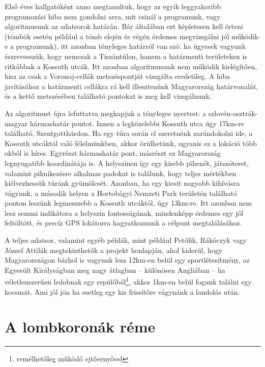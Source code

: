 \documentclass[a5paper,10pt]{article}
\begin{document}
\bigskip

Első éves hallgatóként anno megtanultuk, hogy az egyik leggyakoribb programozási hiba nem gondolni arra, mit csinál a programunk, vagy algoritmusunk az adatsorok határán. Bár általában ezt képletesen kell érteni (tömbök esetén például a tömb elején és végén érdemes megvizsgálni jól működik-e a programunk), itt azonban tényleges határról van szó: ha ügyesek vagyunk észrevesszük, hogy nemcsak a Tiszántúlon, hanem a határmenti területeken is ritkábbak a Kossuth utcák. Itt azonban algoritmusunk nem működik kielégítően, hisz az csak a Voronoj-cellák metszéspontját vizsgálta eredetileg. A hiba javításához a határmenti cellákra rá kell illesztenünk Magyarország határvonalát, és a kettő metszésében található pontokat is meg kell vizsgálnunk.

\bigskip

Az algoritmust újra lefuttatva megkapjuk a tényleges nyertest: a szlovén-osztrák-magyar hármashatár pontot. Innen a legközelebbi Kossuth utca úgy 17km-re található, Szentgotthárdon. Ha egy túra során el szeretnénk zarándokolni ide, a Kossuth utcáktól való félelmünkben, akkor örülhetünk, ugyanis ez a lokáció több okból is híres. Egyrészt hármashatár pont, másrészt ez Magyarország legnyugatibb koordinátája is. A helyszínen így egy kisebb pihenőt, játszóteret, valamint piknikezésre alkalmas padokat is találunk, hogy teljes mértékben kiélvezhessük túránk gyümölcsét. Azonban, ha egy kicsit nagyobb kihívásra vágyunk, a második helyen a Hortobágyi Nemzeti Park területén található ponton leszünk legmesszebb a Kossuth utcáktól, úgy 13km-re. Itt azonban nem lesz semmi indikátora a helyszín fontosságának, mindenképp érdemes egy jól feltöltött, és precíz GPS lokátorra hagyatkoznunk a célpont megtalálásához.

\bigskip

A teljes adatsor, valamint egyéb példák, mint például Petőfik, Rákóczyk vagy József Attilák megtekinthetők a projekt honlapján\cite{kossuthmap}, ahol kiderül, hogy Magyarországon bárhol is vagyunk lesz 12km-en belül egy sportlétesítmény, az Egyesült Királyságban meg nagy átlagban -- különösen Angliában -- ha véletlenszerűen ledobnak egy repülőből\footnote{remélhetőleg működő ejtőernyővel}, akkor 1km-en belül fogunk találni egy kocsmát. Ami jól jön ha esetleg egy kis frissítőre vágynánk a landolás után.


\section{A lombkoronák réme}
\end{document}
